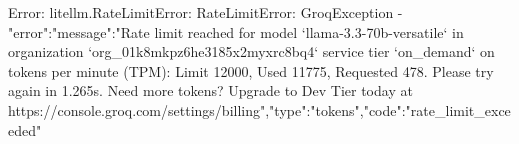 Error: litellm.RateLimitError: RateLimitError: GroqException - {"error":{"message":"Rate limit reached for model `llama-3.3-70b-versatile` in organization `org_01k8mkpz6he3185x2myxrc8bq4` service tier `on_demand` on tokens per minute (TPM): Limit 12000, Used 11775, Requested 478. Please try again in 1.265s. Need more tokens? Upgrade to Dev Tier today at https://console.groq.com/settings/billing","type":"tokens","code":"rate_limit_exceeded"}}
